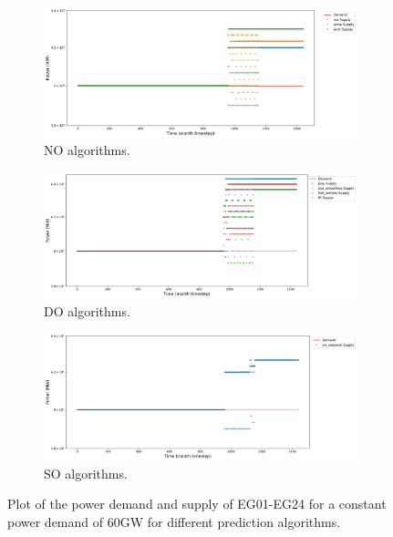 \documentclass[11pt,letterpaper]{article}
\begin{document}
\begin{figure}[]
	\centering
	\begin{subfigure}[t]{\textwidth}
		\centering
		\includegraphics[width=\linewidth]{24-power-bufferB20001.png} 
		\caption{NO algorithms.}
		\label{fig:24powerNO}
	\end{subfigure}
	\vspace{1cm}
	\begin{subfigure}[t]{\textwidth}
		\centering
		\includegraphics[width=\linewidth]{24-power-bufferB20002.png} 
		\caption{DO algorithms.}
		\label{fig:24powerDO}
	\end{subfigure}
	\begin{subfigure}[t]{.95\textwidth}
		\centering
		\includegraphics[width=\linewidth]{24-power-bufferB20003.png} 
		\caption{SO algorithms.}
		\label{fig:24powerSO}
\end{subfigure}
	\hfill
	\caption{Plot of the power demand and supply of EG01-EG24 for a constant power demand of 60GW for different prediction algorithms.}
	\label{fig:24power}
\end{figure}
\end{document}
